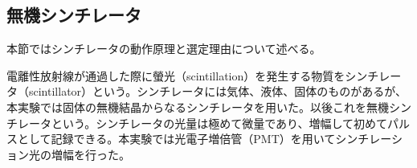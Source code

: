 \documentclass[../../main.tex]{subfiles}
\numberwithin{equation}{section}
\numberwithin{table}{section}
\numberwithin{figure}{section}
\begin{document}
  \subsection{無機シンチレータ}
    本節ではシンチレータの動作原理と選定理由について述べる。

    電離性放射線が通過した際に螢光（scintillation）を発生する物質をシンチレータ（scintillator）という。シンチレータには気体、液体、固体のものがあるが、本実験では固体の無機結晶からなるシンチレータを用いた。以後これを無機シンチレータという。シンチレータの光量は極めて微量であり、増幅して初めてパルスとして記録できる。本実験では光電子増倍管（PMT）を用いてシンチレーション光の増幅を行った。
\end{document}
